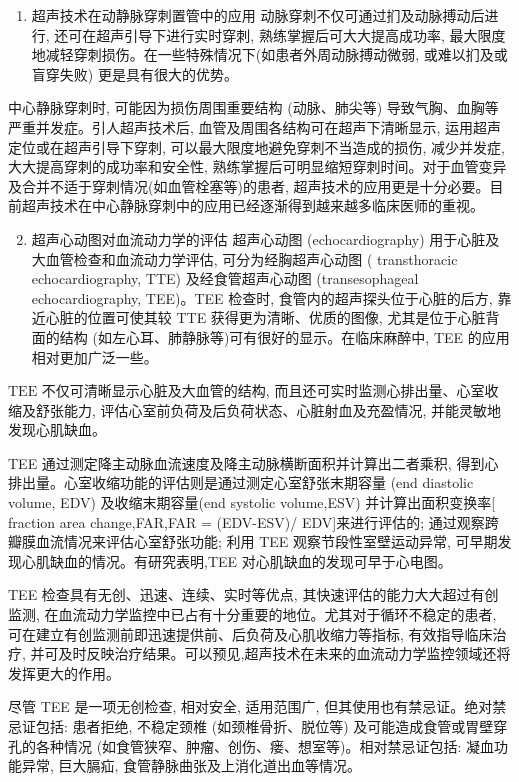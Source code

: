 \documentclass[10pt]{article}
\begin{document}
\begin{enumerate}
  \item 超声技术在动静脉穿刺置管中的应用 动脉穿刺不仅可通过扪及动脉搏动后进行, 还可在超声引导下进行实时穿刺, 熟练掌握后可大大提高成功率, 最大限度地减轻穿刺损伤。在一些特殊情况下(如患者外周动脉搏动微弱, 或难以扪及或盲穿失败) 更是具有很大的优势。
\end{enumerate}

中心静脉穿刺时, 可能因为损伤周围重要结构 (动脉、肺尖等) 导致气胸、血胸等严重并发症。引人超声技术后, 血管及周围各结构可在超声下清晰显示, 运用超声定位或在超声引导下穿刺, 可以最大限度地避免穿刺不当造成的损伤, 减少并发症, 大大提高穿刺的成功率和安全性, 熟练掌握后可明显缩短穿刺时间。对于血管变异及合并不适于穿刺情况(如血管栓塞等)的患者, 超声技术的应用更是十分必要。目前超声技术在中心静脉穿刺中的应用已经逐渐得到越来越多临床医师的重视。

\begin{enumerate}
  \setcounter{enumi}{1}
  \item 超声心动图对血流动力学的评估 超声心动图 (echocardiography) 用于心脏及大血管检查和血流动力学评估, 可分为经胸超声心动图 ( transthoracic echocardiography, TTE) 及经食管超声心动图 (transesophageal echocardiography, TEE)。TEE 检查时, 食管内的超声探头位于心脏的后方, 靠近心脏的位置可使其较 TTE 获得更为清晰、优质的图像, 尤其是位于心脏背面的结构 (如左心耳、肺静脉等)可有很好的显示。在临床麻醉中, TEE 的应用相对更加广泛一些。
\end{enumerate}

$\mathrm{TEE}$ 不仅可清晰显示心脏及大血管的结构, 而且还可实时监测心排出量、心室收缩及舒张能力, 评估心室前负荷及后负荷状态、心脏射血及充盈情况, 并能灵敏地发现心肌缺血。

TEE 通过测定降主动脉血流速度及降主动脉横断面积并计算出二者乘积, 得到心排出量。心室收缩功能的评估则是通过测定心室舒张末期容量 (end diastolic volume, EDV) 及收缩末期容量(end systolic volume,ESV) 并计算出面积变换率[ fraction area change,FAR,FAR = (EDV-ESV)/ EDV]来进行评估的; 通过观察跨瓣膜血流情况来评估心室舒张功能; 利用 TEE 观察节段性室壁运动异常, 可早期发现心肌缺血的情况。有研究表明,TEE 对心肌缺血的发现可早于心电图。

TEE 检查具有无创、迅速、连续、实时等优点, 其快速评估的能力大大超过有创监测, 在血流动力学监控中已占有十分重要的地位。尤其对于循环不稳定的患者, 可在建立有创监测前即迅速提供前、后负荷及心肌收缩力等指标, 有效指导临床治疗, 并可及时反映治疗结果。可以预见,超声技术在未来的血流动力学监控领域还将发挥更大的作用。

尽管 TEE 是一项无创检查, 相对安全, 适用范围广, 但其使用也有禁忌证。绝对禁忌证包括: 患者拒绝, 不稳定颈椎 (如颈椎骨折、脱位等) 及可能造成食管或胃壁穿孔的各种情况 (如食管狭窄、肿瘤、创伤、瘘、想室等)。相对禁忌证包括: 凝血功能异常, 巨大膈疝, 食管静脉曲张及上消化道出血等情况。
\end{document}
